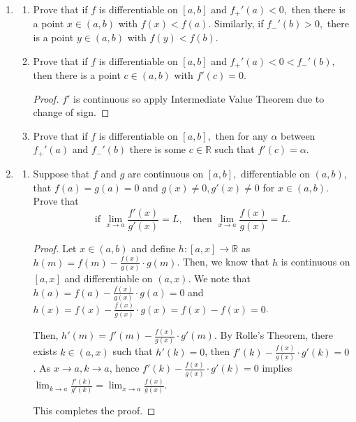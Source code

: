 \documentclass[11pt]{article}
\newcommand{\bbR}{\mathbb{R}}
\renewcommand{\_}[1]{\underline{ #1 }}
\theoremstyle{definition}
\numberwithin{equation}{subsection}
\begin{document}
\begin{enumerate}
\item
\begin{enumerate}
\item Prove that if $f$ is differentiable on $[a,b]$ and $f_{+}'(a)<0,$ then there is a point $x\in (a,b)$ with $f(x)<f(a).$ Similarly, if $f_{-}'(b)>0,$ there is a point $y\in (a,b)$ with $f(y)<f(b).$
\item Prove that if $f$ is differentiable on $[a,b]$ and $f_{+}'(a)<0<f_{-}'(b)$, then there is a point $c\in (a,b)$ with $f'(c)=0.$ 

\begin{proof}

$f'$ is continuous so apply Intermediate Value Theorem due to change of sign.


\renewcommand\qedsymbol{QED}
\end{proof}


\item  Prove that if $f$ is differentiable on $[a,b],$  then for any $\alpha $ between $f_{+}'(a)$ and $f_{-}'(b)$ there is some $c\in\bbR$ such that $f'(c)=\alpha.$ 
\end{enumerate}

\item 
\begin{enumerate}
\item Suppose that $f$ and $g$ are continuous on $[a,b],$ differentiable on $(a,b)$, that $f(a)=g(a)=0$ and $g(x)\neq 0, g'(x)\neq 0$ for $x\in (a,b).$ Prove that 
$$\text{if } \lim_{x\to a}\frac{f'(x)}{g'(x)}=L,\quad \text{then } \lim_{x\to a}\frac{f(x)}{g(x)}=L.$$

\begin{proof}
Let $x \in (a,b)$ and define $h: [a,x] \rightarrow \bbR$ as $h(m)=f(m)-\frac{f(x)}{g(x)}\cdot g(m)$. Then, we know that $h$ is continuous on $[a,x]$ and differentiable on $(a,x)$. We note that $h(a)=f(a)-\frac{f(x)}{g(x)}\cdot g(a) = 0$ and $h(x)=f(x)-\frac{f(x)}{g(x)}\cdot g(x) = f(x)-f(x)=0$.  

Then, $h'(m)=f'(m)-\frac{f(x)}{g(x)}\cdot g'(m)$. By Rolle's Theorem, there exists $k\in (a,x)$ such that $h'(k)=0$, then $f'(k)-\frac{f(x)}{g(x)}\cdot g'(k)=0$. As $x\to a, k\to a$, hence $f'(k)-\frac{f(x)}{g(x)}\cdot g'(k)=0$ implies $\lim_{k\to a} \frac{f'(k)}{g'(k)}=\lim_{x\to a} \frac{f(x)}{g(x)}$.

This completes the proof.

\renewcommand\qedsymbol{QED}
\end{proof}




\end{enumerate}
\end{enumerate}
\end{document}
